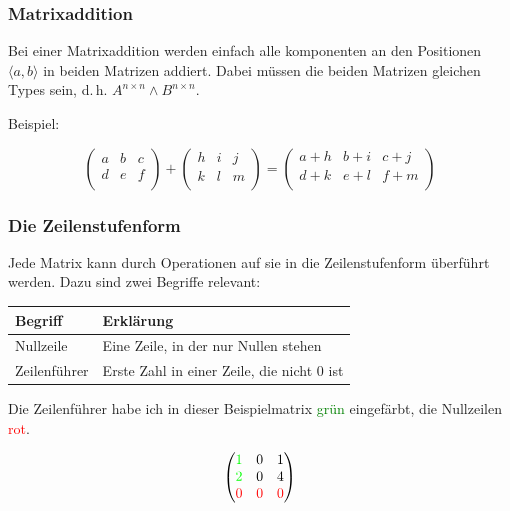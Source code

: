 \documentclass{scrartcl}
\begin{document}
\subsubsection{Matrixaddition}

Bei einer Matrixaddition werden einfach alle komponenten an den Positionen $\langle a, b\rangle$ in beiden Matrizen addiert.
Dabei müssen die beiden Matrizen gleichen Types sein, d.\,h. $A^{n\times n} \wedge B^{n\times n}$.

Beispiel:

\begin{equation}
	\begin{pmatrix*}
		a & b & c\\
		d & e & f\\
	\end{pmatrix*} + \begin{pmatrix*}
		h & i & j\\
		k & l & m\\
	\end{pmatrix*} = \begin{pmatrix*}
		a+h & b+i & c+j\\
		d+k & e+l & f+m\\
	\end{pmatrix*}
\end{equation}

\subsubsection{Die Zeilenstufenform}

\label{zeilenstufenform}
Jede Matrix kann durch Operationen auf sie in die Zeilenstufenform überführt werden. Dazu sind zwei
Begriffe relevant:

\begin{tabular}{|l|l|}
	\hline
	Begriff & Erklärung\\ \hline
	Nullzeile & Eine Zeile, in der nur Nullen stehen\\
	Zeilenführer & Erste Zahl in einer Zeile, die nicht $0$ ist\\
	\hline
\end{tabular}

Die Zeilenführer habe ich in dieser Beispielmatrix \textcolor{green}{grün} eingefärbt, die 
Nullzeilen \textcolor{red}{rot}.

\begin{equation}
	\begin{pmatrix*}
		\textcolor{green}{1} & 0 & 1\\
		\textcolor{green}{2} & 0 & 4\\
		\textcolor{red}{0} & \textcolor{red}{0} & \textcolor{red}{0}\\
	\end{pmatrix*}
\end{equation}
\end{document}
